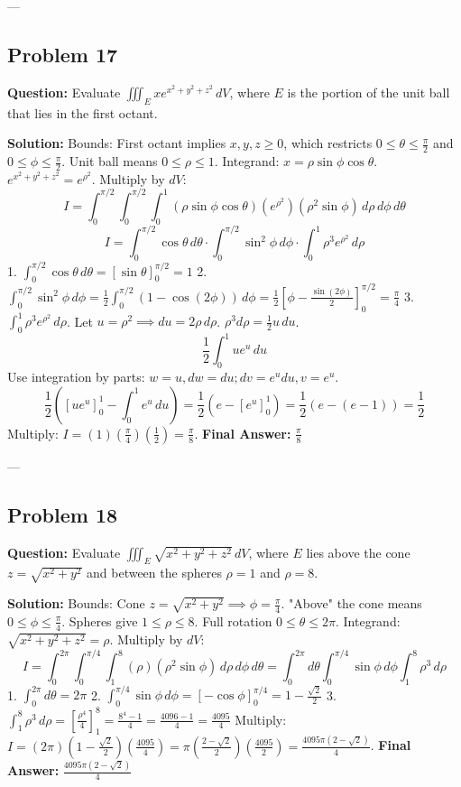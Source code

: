 \documentclass[12pt]{article}
\begin{document}
---

\subsection*{Problem 17}
\textbf{Question:} Evaluate $\iiint_E x e^{x^2+y^2+z^2} \, dV$, where $E$ is the portion of the unit ball that lies in the first octant.

\textbf{Solution:}
Bounds: First octant implies $x, y, z \ge 0$, which restricts $0 \le \theta \le \frac{\pi}{2}$ and $0 \le \phi \le \frac{\pi}{2}$. Unit ball means $0 \le \rho \le 1$.
Integrand: $x = \rho \sin\phi \cos\theta$. $e^{x^2+y^2+z^2} = e^{\rho^2}$.
Multiply by $dV$:
\[ I = \int_0^{\pi/2} \int_0^{\pi/2} \int_0^1 (\rho \sin\phi \cos\theta)(e^{\rho^2})(\rho^2 \sin\phi) \, d\rho \, d\phi \, d\theta \]
\[ I = \int_0^{\pi/2} \cos\theta \, d\theta \cdot \int_0^{\pi/2} \sin^2\phi \, d\phi \cdot \int_0^1 \rho^3 e^{\rho^2} \, d\rho \]
1. $\int_0^{\pi/2} \cos\theta \, d\theta = [\sin\theta]_0^{\pi/2} = 1$
2. $\int_0^{\pi/2} \sin^2\phi \, d\phi = \frac{1}{2} \int_0^{\pi/2} (1-\cos(2\phi)) \, d\phi = \frac{1}{2} \left[ \phi - \frac{\sin(2\phi)}{2} \right]_0^{\pi/2} = \frac{\pi}{4}$
3. $\int_0^1 \rho^3 e^{\rho^2} \, d\rho$. Let $u = \rho^2 \implies du = 2\rho \, d\rho$. $\rho^3 d\rho = \frac{1}{2} u \, du$.
\[ \frac{1}{2} \int_0^1 u e^u \, du \]
Use integration by parts: $w = u, dw = du; dv = e^u du, v = e^u$.
\[ \frac{1}{2} \left( [u e^u]_0^1 - \int_0^1 e^u \, du \right) = \frac{1}{2} \left( e - [e^u]_0^1 \right) = \frac{1}{2} (e - (e - 1)) = \frac{1}{2} \]
Multiply: $I = (1) \left(\frac{\pi}{4}\right) \left(\frac{1}{2}\right) = \frac{\pi}{8}$.
\textbf{Final Answer:} $\frac{\pi}{8}$

---

\subsection*{Problem 18}
\textbf{Question:} Evaluate $\iiint_E \sqrt{x^2+y^2+z^2} \, dV$, where $E$ lies above the cone $z = \sqrt{x^2+y^2}$ and between the spheres $\rho=1$ and $\rho=8$.

\textbf{Solution:}
Bounds: Cone $z = \sqrt{x^2+y^2} \implies \phi = \frac{\pi}{4}$. "Above" the cone means $0 \le \phi \le \frac{\pi}{4}$. Spheres give $1 \le \rho \le 8$. Full rotation $0 \le \theta \le 2\pi$.
Integrand: $\sqrt{x^2+y^2+z^2} = \rho$.
Multiply by $dV$:
\[ I = \int_0^{2\pi} \int_0^{\pi/4} \int_1^8 (\rho)(\rho^2 \sin\phi) \, d\rho \, d\phi \, d\theta = \int_0^{2\pi} d\theta \int_0^{\pi/4} \sin\phi \, d\phi \int_1^8 \rho^3 \, d\rho \]
1. $\int_0^{2\pi} d\theta = 2\pi$
2. $\int_0^{\pi/4} \sin\phi \, d\phi = [-\cos\phi]_0^{\pi/4} = 1 - \frac{\sqrt{2}}{2}$
3. $\int_1^8 \rho^3 \, d\rho = \left[ \frac{\rho^4}{4} \right]_1^8 = \frac{8^4 - 1}{4} = \frac{4096 - 1}{4} = \frac{4095}{4}$
Multiply: $I = (2\pi) \left( 1 - \frac{\sqrt{2}}{2} \right) \left( \frac{4095}{4} \right) = \pi \left( \frac{2-\sqrt{2}}{2} \right) \left( \frac{4095}{2} \right) = \frac{4095\pi(2-\sqrt{2})}{4}$.
\textbf{Final Answer:} $\frac{4095\pi(2-\sqrt{2})}{4}$
\end{document}
